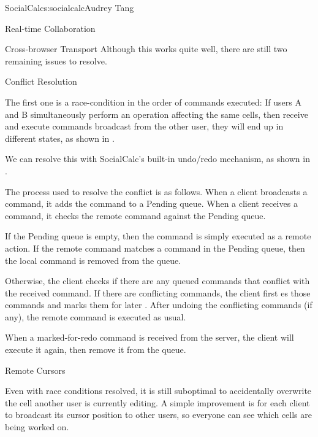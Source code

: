 \begin{aosachapter}{SocialCalc}{s:socialcalc}{Audrey Tang}
\begin{aosasect1}{Real-time Collaboration}
\begin{aosasect2}{Cross-browser Transport}
\noindent Although this works quite well, there are still two remaining issues
to resolve.

\end{aosasect2}

\begin{aosasect2}{Conflict Resolution}

The first one is a race-condition in the order of commands executed:
If users A and B simultaneously perform an operation affecting the
same cells, then receive and execute commands broadcast from the other
user, they will end up in different states, as shown in
.


We can resolve this with SocialCalc's built-in undo/redo mechanism, as
shown in .


The process used to resolve the conflict is as follows.  When a client
broadcasts a command, it adds the command to a Pending queue.  When a client
receives a command, it checks the remote command against the Pending queue.

If the Pending queue is empty, then the command is simply executed as a remote
action. If the remote command matches a command in the Pending queue, then the
local command is removed from the queue.

Otherwise, the client checks if there are any queued commands that conflict
with the received command.  If there are conflicting commands, the client first
es those commands and marks them for later .  After
undoing the conflicting commands (if any), the remote command is executed as
usual.

When a marked-for-redo command is received from the server, the client will
execute it again, then remove it from the queue.


\end{aosasect2}

\begin{aosasect2}{Remote Cursors}

Even with race conditions resolved, it is still suboptimal to
accidentally overwrite the cell another user is currently editing.  A
simple improvement is for each client to broadcast its cursor position
to other users, so everyone can see which cells are being worked on.


\end{aosasect2}
\end{aosasect1}
\end{aosachapter}
